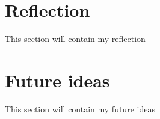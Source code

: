 \section{Reflection}
\label{s:Reflection}
This section will contain my reflection

\section{Future ideas}
\label{s:Future-ideas}
This section will contain my future ideas
